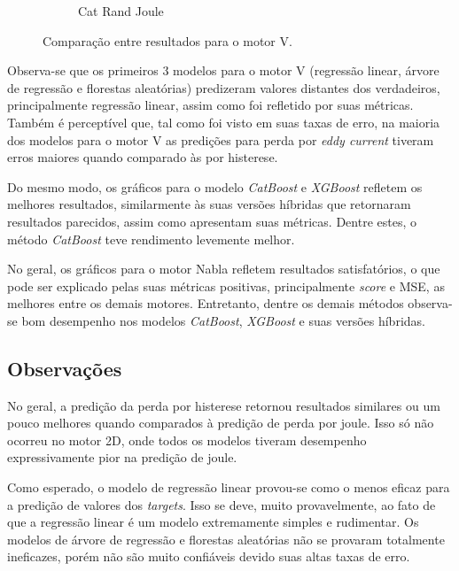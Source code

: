 \documentclass{article}
\begin{document}
\begin{figure}[!htbp]
\begin{subfigure}[b]{0.23\textwidth}
        \caption{Cat Rand Joule}
    \end{subfigure}
    \hfill
    \begin{subfigure}[b]{0.23\textwidth}
        \centering
        \null
    \end{subfigure}
    
    \caption{Comparação entre resultados para o motor V.}
\end{figure}

Observa-se que os primeiros 3 modelos para o motor V (regressão linear, árvore de regressão e florestas aleatórias) predizeram valores distantes dos verdadeiros, principalmente regressão linear, assim como foi refletido por suas métricas. Também é perceptível que, tal como foi visto em suas taxas de erro, na maioria dos modelos para o motor V as predições para perda por \textit{eddy current} tiveram erros maiores quando comparado às por histerese.

Do mesmo modo, os gráficos para o modelo \textit{CatBoost} e \textit{XGBoost} refletem os melhores resultados, similarmente às suas versões híbridas que retornaram resultados parecidos, assim como apresentam suas métricas. Dentre estes, o método \textit{CatBoost} teve rendimento levemente melhor.

No geral, os gráficos para o motor Nabla refletem resultados satisfatórios, o que pode ser explicado pelas suas métricas positivas, principalmente \textit{score} e MSE, as melhores entre os demais motores. Entretanto, dentre os demais métodos observa-se bom desempenho nos modelos \textit{CatBoost}, \textit{XGBoost} e suas versões híbridas.

\newpage

\subsection{Observações}

No geral, a predição da perda por histerese retornou resultados similares ou um pouco melhores quando comparados à predição de perda por joule. Isso só não ocorreu no motor 2D, onde todos os modelos tiveram desempenho expressivamente pior na predição de joule.

Como esperado, o modelo de regressão linear provou-se como o menos eficaz para a predição de valores dos \textit{targets}. Isso se deve, muito provavelmente, ao fato de que a regressão linear é um modelo extremamente simples e rudimentar. Os modelos de árvore de regressão e florestas aleatórias não se provaram totalmente ineficazes, porém não são muito confiáveis devido suas altas taxas de erro.
\end{document}
